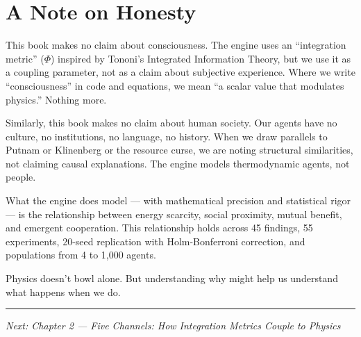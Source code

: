 \section{A Note on Honesty}\label{a-note-on-honesty}

This book makes no claim about consciousness. The engine uses an ``integration metric'' ($\Phi$) inspired by Tononi's Integrated Information Theory, but we use it as a coupling parameter, not as a claim about subjective experience. Where we write ``consciousness'' in code and equations, we mean ``a scalar value that modulates physics.'' Nothing more.

Similarly, this book makes no claim about human society. Our agents have no culture, no institutions, no language, no history. When we draw parallels to Putnam or Klinenberg or the resource curse, we are noting structural similarities, not claiming causal explanations. The engine models thermodynamic agents, not people.

What the engine does model --- with mathematical precision and statistical rigor --- is the relationship between energy scarcity, social proximity, mutual benefit, and emergent cooperation. This relationship holds across 45 findings, 55 experiments, 20-seed replication with Holm-Bonferroni correction, and populations from 4 to 1,000 agents.

Physics doesn't bowl alone. But understanding why might help us understand what happens when we do.

\begin{center}\rule{0.5\linewidth}{0.5pt}\end{center}

\emph{Next: Chapter 2 --- Five Channels: How Integration Metrics Couple to Physics}

